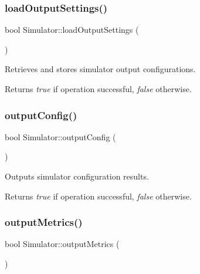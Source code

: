 \subsubsection{\texorpdfstring{load\+Output\+Settings()}{loadOutputSettings()}}
{\footnotesize\ttfamily bool Simulator\+::load\+Output\+Settings (\begin{DoxyParamCaption}{ }\end{DoxyParamCaption})\hspace{0.3cm}{\ttfamily [private]}}



Retrieves and stores simulator output configurations. 

\begin{DoxyReturn}{Returns}
{\itshape true} if operation successful, {\itshape false} otherwise. 
\end{DoxyReturn}
\hypertarget{class_simulator_a9ddc90646b161542172481657319383d}{}\label{class_simulator_a9ddc90646b161542172481657319383d} 
\subsubsection{\texorpdfstring{output\+Config()}{outputConfig()}}
{\footnotesize\ttfamily bool Simulator\+::output\+Config (\begin{DoxyParamCaption}{ }\end{DoxyParamCaption})\hspace{0.3cm}{\ttfamily [private]}}



Outputs simulator configuration results. 

\begin{DoxyReturn}{Returns}
{\itshape true} if operation successful, {\itshape false} otherwise. 
\end{DoxyReturn}
\hypertarget{class_simulator_af2c84f4f2111c69cc6608901b45e067e}{}\label{class_simulator_af2c84f4f2111c69cc6608901b45e067e} 
\subsubsection{\texorpdfstring{output\+Metrics()}{outputMetrics()}}
{\footnotesize\ttfamily bool Simulator\+::output\+Metrics (\begin{DoxyParamCaption}{ }\end{DoxyParamCaption})\hspace{0.3cm}{\ttfamily [private]}}



